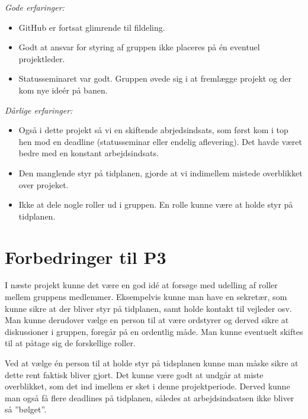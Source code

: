 \emph{Gode erfaringer:}
\begin {itemize}
\item  GitHub er fortsat glimrende til fildeling.

\item	Godt at ansvar for styring af gruppen ikke placeres på én eventuel projektleder. 

\item	Statusseminaret var godt. Gruppen øvede sig i at fremlægge projekt og der kom nye ideér på banen.
\end{itemize}\emph{Dårlige erfaringer:}
\begin{itemize}
\item	Også i dette projekt så vi en skiftende abrjedsindsats, som først kom i top hen mod en deadline (statusseminar eller endelig aflevering). Det havde været bedre med en konstant arbejdsindsats. 

\item	Den manglende styr på tidplanen, gjorde at vi indimellem mistede overblikket over projeket. 

\item	Ikke at dele nogle roller ud i gruppen. En rolle kunne være at holde styr på tidplanen.
\end{itemize}

\section{Forbedringer til P3}

I næste projekt kunne det være en god idé at forsøge med udelling af roller mellem gruppens medlemmer. Eksempelvis kunne man have en sekretær, som kunne sikre at der bliver styr på tidplanen, samt holde kontakt til vejleder osv. Man kunne derudover vælge en person til at være ordstyrer og derved sikre at diskussioner i gruppen, foregår på en ordentlig måde. Man kunne eventuelt skiftes til at påtage sig de forskellige roller. 

Ved at vælge én person til at holde styr på tidsplanen kunne man måske sikre at dette rent faktisk bliver gjort. Det kunne være godt at undgår at miste overblikket, som det ind imellem er sket i denne projektperiode. Derved kunne man også få flere deadlines på tidplanen, således at arbejdsindsatsen ikke bliver så ”bølget”.

